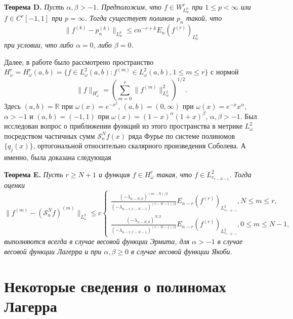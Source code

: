 \textbf{Теорема D.}
\textit{
Пусть $\alpha,\beta>-1$. Предположим, что $f\in W^r_{L^p_w}$ при $1\le p<\infty$ или $f\in C^r[-1,1]$ при $p=\infty$. Тогда существует полином $p_n$ такой, что
$$
\|f^{(k)}-p_n^{(k)}\|_{L^p_w}\le c n^{-r+k}E_n(f^{(r)})_{L^p_w}
$$
при условии, что либо $\alpha=0$, либо $\beta=0$.
}

Далее, в работе \cite{Approx-Juan} было рассмотрено пространство $H^r_\omega=H^r_\omega(a,b)=\{f\in L^2_\omega(a,b): f^{(m)}\in L^2_\omega(a,b), 1\le m\le r\}$ с нормой
$$
\|f\|_{H^r_\omega}=\left(\sum_{m=0}^{r}\|f^{(m)}\|^2_{L^2_w}\right)^{1/2}.
$$
Здесь $(a, b)=\mathbb{R}$ при $\omega(x)=e^{-x^2}$, $(a,b)=(0, \infty)$ при $\omega(x)=e^{-x}x^\alpha$, $\alpha>-1$ и $(a,b)=(-1, 1)$ при $\omega(x)=(1-x)^\alpha(1+x)^\beta$, $\alpha, \beta>-1$.
Был исследован вопрос о приближении функций из этого пространства в метрике $L^2_\omega$ посредством частичных сумм $\mathcal{S}_n^Nf(x)$ ряда Фурье по системе полиномов $\{q_j(x)\}$, ортогональной относительно скалярного произведения Соболева. А именно, была доказана следующая

\textbf{Теорема E.}
\textit{
Пусть $r\ge N+1$ и функция $f\in H^r_\omega$ такая, что $f\in L^2_{v_{r-N-1}}$. Тогда оценки
$$
\|f^{(m)}-(\mathcal{S}_n^Nf)^{(m)}\|_{L^2_\omega}\le c
\begin{cases}
\frac{(-\lambda_{n-N,0})^{(m-N)/2}}{(-\lambda_{n-r,r-N-1})^{(r-N-1)/2}}E_{n-r}(f^{(r)})_{L^2_{v_{r-N-1}}}, N\le m\le r, \\
\frac{(-\lambda_{n-N,0})^{N/2}}{(-\lambda_{n-r,r-N-1})^{(r-N-1)/2}}E_{n-r}(f^{(r)})_{L^2_{v_{r-N-1}}}, 0\le m\le N-1,
\end{cases}
$$
выполняются всегда в случае весовой функции Эрмита, для $\alpha>-1$ в случае весовой функции Лагерра и при $\alpha, \beta\ge0$ в случае весовой функции Якоби.
}

\section{Некоторые сведения о полиномах Лагерра}


